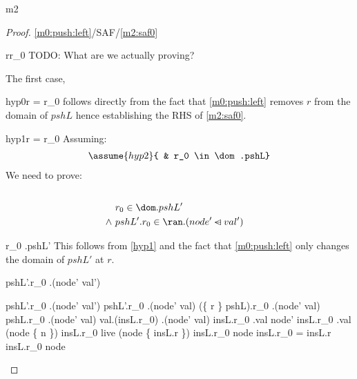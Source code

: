 \documentclass[12pt]{amsart}
\begin{document}
\begin{machine}{m2}
\newcommand{\finter}{\binter}
\begin{proof}{\ref{m0:push:left}/SAF/\ref{m2:saf0}}
	\begin{free:var}{r}{r_0}
	TODO: What are we actually proving?
	\begin{by:cases}
	The first case,
	\begin{case}{hyp0}{r = r_0}
		follows directly from the fact that \ref{m0:push:left} removes
		$r$ from the domain of $pshL$ hence establishing the RHS of \eqref{m2:saf0}.
		\easy
	\end{case}		
	\begin{case}{hyp1}{\neg r = r_0}
		Assuming:
		\begin{align*}
		\assume{hyp2}{ & r_0 \in \dom.pshL}
		\end{align*}
		We need to prove:
		\begin{align*}
		\\ \goal{& r_0 \in \dom.pshL' 
		\\	\land ~ & pshL'.r_0 \in \ran.(node' \domsub val') }
		\end{align*}
		\begin{by:parts}
		\begin{part:a}{ r_0 \in \dom.pshL' }
		This follows from \eqref{hyp1} and the fact that \ref{m0:push:left} only changes the domain of $pshL'$ at $r$.
			\easy
		\end{part:a}
		\begin{part:a}{pshL'.r_0 \in \ran.(node' \domsub val')}
		\begin{calculation}
			pshL'.r_0 \in \ran.(node' \domsub val')
			pshL'.r_0 \in \ran.(node'  \domsub val)
			(\{ r \} \domsub pshL).r_0 \in 
			\ran.(node' \domsub val)
		\hint{=}{ \eqref{hyp1} }
			pshL.r_0 \in \ran.(node' \domsub val)
			val.(insL.r_0) \in \ran.(node' \domsub val)
		\hint{\follows}{  }
			insL.r_0 \in \dom.val \setminus node'
		\hint{=}{ \eqref{m2:a1} }
			insL.r_0 \in 
					\dom.val \setminus (node \bunion \{ n \}) 
		\hint{=}{ \eqref{m2:inv1} ,
				  \eqref{m2:inv6} ,
				  \eqref{m2:grd2} }
			insL.r_0 \in live \setminus (node \bunion \{ insL.r \}) 
		\hint{=}{ 	\eqref{hyp2} ,
					\eqref{m2:inv5} }
			\neg insL.r_0 \in node \1\land \neg insL.r_0 = insL.r
		\hint{=}{ \eqref{m2:inv7}, 
				\eqref{hyp1}, 
				\eqref{hyp2}, 
				\eqref{m1:grd1},
				\eqref{m2:inv5} }
			\neg insL.r_0 \in node
		\hint{\follows}{ \eqref{m2:inv8}; 
				\eqref{hyp2}; 
				\eqref{m2:inv5} }
			\true
		\end{calculation}
		\end{part:a}
		\end{by:parts}
	\end{case}		
	\end{by:cases}
	\end{free:var}
\end{proof}


\end{machine}
\end{document}
